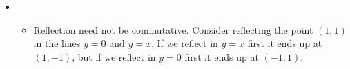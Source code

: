 \documentclass[fleqn,a4paper,11pt]{article}
\begin{document}
\begin{enumerate}[label=\textbf{\arabic*.}]
\begin{enumerate}[label=(\alph*)]
\begin{itemize}
\begin{itemize}
         \item
          The general form of a shear is
          \begin{equation*}
           \begin{pmatrix*}[r]
            1 & \lambda \\
            0 & 1
           \end{pmatrix*}
          \end{equation*}
          (or its transpose) which also both have determinant 1.
        \end{itemize}
       \item
        \begin{itemize}
         \item
          Reflection need not be commutative. Consider reflecting the point
          \((1, 1)\) in the lines \(y = 0\) and \(y = x\). If we reflect in
          \(y = x\) first it ends up at \((1, -1)\), but if we reflect in
          \(y = 0\) first it ends up at \((-1, 1)\).


\end{itemize}
\end{itemize}
\end{enumerate}
\end{enumerate}
\end{document}
